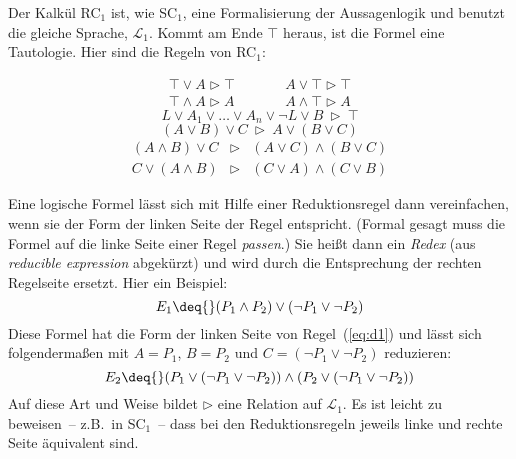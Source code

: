 Der Kalkül RC$_1$ ist, wie SC$_1$, eine Formalisierung der Aussagenlogik und
benutzt die gleiche Sprache, $\mathcal{L}_1$.  Kommt am Ende $\top$ heraus, ist
die Formel eine Tautologie.  Hier sind die Regeln von RC$_1$:
%
\begin{definition}
\begin{eqnarray}
    \top\vee A\triangleright \top &\qquad& A\vee\top \triangleright\top\label{eq:e1}\\%
    \top\wedge A\triangleright A &\qquad& A\wedge\top\triangleright A\label{eq:e2}%
\end{eqnarray}
\begin{equation}
  L\vee A_1\vee\ldots \vee A_n\vee\neg L\vee B\:\triangleright\: \top\label{eq:t}%
\end{equation}
\begin{equation}
  (A\vee B)\vee C\:\triangleright\: A\vee(B\vee C)\label{eq:a}%
\end{equation}
\begin{eqnarray}
  (A\wedge B)\vee C&\triangleright& (A\vee C)\wedge (B\vee C)\label{eq:d1}\\%
  C\vee(A\wedge B)&\triangleright& (C\vee A)\wedge (C\vee B)\label{eq:d2}%
\end{eqnarray}
\end{definition}
%
Eine logische Formel lässt sich
mit Hilfe einer Reduktionsregel dann vereinfachen, wenn sie der Form
der linken Seite der Regel entspricht.  (Formal gesagt muss die Formel
auf die linke Seite einer Regel \textit{passen}.)  
Sie heißt dann ein \emph{Redex} (aus
\emph{reducible expression} abgekürzt) und wird durch die
Entsprechung der rechten Regelseite ersetzt.  Hier ein Beispiel:
%
\begin{displaymath}
  E_1 \deq{} (P_1\wedge P_2)\vee (\neg
    P_1\vee \neg P_2)
\end{displaymath}
%
Diese Formel hat die Form der linken Seite von Regel~(\ref{eq:d1}) und lässt
sich folgendermaßen mit $A=P_1$,
$B=P_2$ und $C=(\neg P_1\vee\neg{P_2})$
reduzieren:
%
\begin{displaymath}
  E_2 \deq{} (P_1\vee(\neg P_1\vee\neg{P_2}))\wedge 
  (P_2\vee(\neg P_1\vee\neg{P_2}))
\end{displaymath}
%
Auf
diese Art und Weise bildet $\triangleright$ eine Relation auf
$\mathcal{L}_1$.
Es ist leicht zu beweisen~-- z.B.\ in SC$_1$~-- dass bei den
Reduktionsregeln jeweils linke und rechte Seite äquivalent sind.

